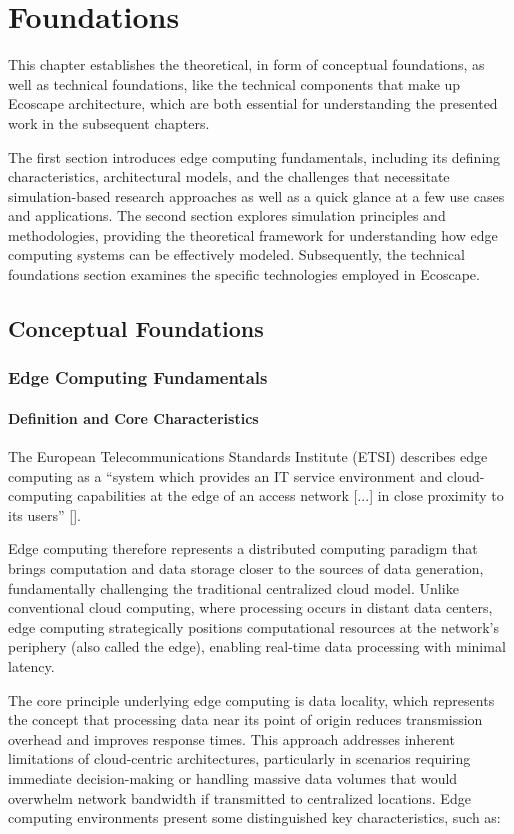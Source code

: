 \chapter{Foundations}
This chapter establishes the theoretical, in form of conceptual foundations, as well as technical foundations, like the technical components that make up Ecoscape architecture, 
which are both essential for understanding the presented work in the subsequent chapters.

The first section introduces edge computing fundamentals, including its defining characteristics, architectural models, and the challenges that necessitate simulation-based research approaches as well as a quick glance at a few use cases and applications.
The second section explores simulation principles and methodologies, providing the theoretical framework for understanding how edge computing systems can be effectively modeled.
Subsequently, the technical foundations section examines the specific technologies employed in Ecoscape.
\section{Conceptual Foundations}
\subsection{Edge Computing Fundamentals}
\subsubsection{Definition and Core Characteristics}
The European Telecommunications Standards Institute (ETSI) describes edge computing as a ``system which provides an IT service environment and cloud-computing capabilities at the edge of an access network [...] in close proximity to its users'' [\cite{etsi_mec}].

Edge computing therefore represents a distributed computing paradigm that brings computation and data storage closer to the sources of data generation, fundamentally challenging the traditional centralized cloud model.
Unlike conventional cloud computing, where processing occurs in distant data centers, edge computing strategically positions computational resources at the network's periphery (also called the edge), enabling real-time data processing with minimal latency.

The core principle underlying edge computing is data locality, which represents the concept that processing data near its point of origin reduces transmission overhead and improves response times.
This approach addresses inherent limitations of cloud-centric architectures, particularly in scenarios requiring immediate decision-making or handling massive data volumes that would overwhelm network bandwidth if transmitted to centralized locations.
Edge computing environments present some distinguished key characteristics, such as:

